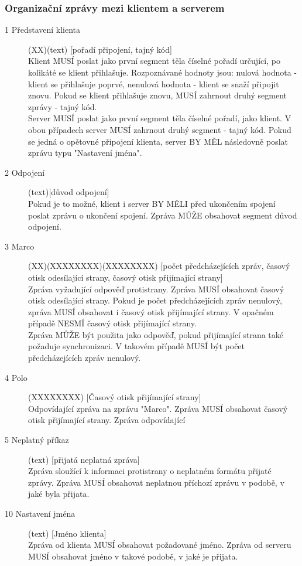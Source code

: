 \documentclass[12pt,a4paper]{article}
\begin{document}
\subsubsection*{Organizační zprávy mezi klientem a serverem}
\begin{description}
\item[1 Představení klienta] (XX)(text) [pořadí připojení, tajný kód] \\
Klient MUSÍ poslat jako první segment těla číselné pořadí určující, po kolikáté se klient přihlašuje. Rozpoznávané hodnoty jsou: nulová hodnota - klient se přihlašuje poprvé, nenulová hodnota - klient se snaží připojit znovu. Pokud se klient přihlašuje znovu, MUSÍ zahrnout druhý segment zprávy - tajný kód. \\
Server MUSÍ poslat jako první segment těla číselné pořadí, jako klient. V obou případech server MUSÍ zahrnout druhý segment - tajný kód.
Pokud se jedná o opětovné připojení klienta, server BY MĚL následovně poslat zprávu typu "Nastavení jména".
\item[2 Odpojení] (text)[důvod odpojení]\\
Pokud je to možné, klient i server BY MĚLI před ukončením spojení poslat zprávu o ukončení spojení. Zpráva MŮŽE obsahovat segment důvod odpojení.
\item[3 Marco] (XX)(XXXXXXXX)(XXXXXXXX) [počet předcházejících zpráv, časový otisk odesílající strany, časový otisk přijímající strany] \\
Zpráva vyžadující odpověď protistrany. Zpráva MUSÍ obsahovat časový otisk odesílající strany. Pokud je počet předcházejících zpráv nenulový, zpráva MUSÍ obsahovat i časový otisk přijímající strany. V opačném případě NESMÍ časový otisk přijímající strany. \\
Zpráva MŮŽE být použita jako odpověď, pokud přijímající strana také požaduje synchronizaci. V takovém případě MUSÍ být počet předcházejících zpráv nenulový.
\item[4 Polo] (XXXXXXXX) [Časový otisk přijímající strany]\\
Odpovídající zpráva na zprávu "Marco". Zpráva MUSÍ obsahovat časový otisk přijímající strany.
Zpráva odpovídající
\item[5 Neplatný příkaz] (text) [přijatá neplatná zpráva]\\
Zpráva sloužící k informaci protistrany o neplatném formátu přijaté zprávy. Zpráva MUSÍ obsahovat neplatnou příchozí zprávu v podobě, v jaké byla přijata.
\item[10 Nastavení jména] (text) [Jméno klienta] \\
Zpráva od klienta MUSÍ obsahovat požadované jméno. Zpráva od serveru MUSÍ obsahovat jméno v takové podobě, v jaké je přijata.
\end{description}
\end{document}
